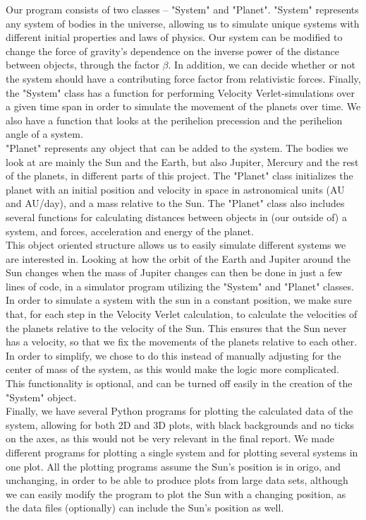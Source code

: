 \documentclass{article}
\begin{document}
    Our program consists of two classes – "System" and "Planet". "System" represents any system of bodies in the universe, allowing us to simulate unique systems with different initial properties and laws of physics. Our system can be modified to change the force of gravity's dependence on the inverse power of the distance between objects, through the factor $\beta$. In addition, we can decide whether or not the system should have a contributing force factor from relativistic forces. Finally, the "System" class has a function for performing Velocity Verlet-simulations over a given time span in order to simulate the movement of the planets over time. We also have a function that looks at the perihelion precession and the perihelion angle of a system.\\
    "Planet" represents any object that can be added to the system. The bodies we look at are mainly the Sun and the Earth, but also Jupiter, Mercury and the rest of the planets, in different parts of this project. The "Planet" class initializes the planet with an initial position and velocity in space in astronomical units (AU and AU/day), and a mass relative to the Sun. The "Planet" class also includes several functions for calculating distances between objects in (our outside of) a system, and forces, acceleration and energy of the planet.\\

    This object oriented structure allows us to easily simulate different systems we are interested in. Looking at how the orbit of the Earth and Jupiter around the Sun changes when the mass of Jupiter changes can then be done in just a few lines of code, in a simulator program utilizing the "System" and "Planet" classes.\\

    In order to simulate a system with the sun in a constant position, we make sure that, for each step in the Velocity Verlet calculation, to calculate the velocities of the planets relative to the velocity of the Sun. This ensures that the Sun never has a velocity, so that we fix the movements of the planets relative to each other. In order to simplify, we chose to do this instead of manually adjusting for the center of mass of the system, as this would make the logic more complicated. This functionality is optional, and can be turned off easily in the creation of the "System" object.\\

    Finally, we have several Python programs for plotting the calculated data of the system, allowing for both 2D and 3D plots, with black backgrounds and no ticks on the axes, as this would not be very relevant in the final report. We made different programs for plotting a single system and for plotting several systems in one plot. All the plotting programs assume the Sun's position is in origo, and unchanging, in order to be able to produce plots from large data sets, although we can easily modify the program to plot the Sun with a changing position, as the data files (optionally) can include the Sun's position as well.
\end{document}
